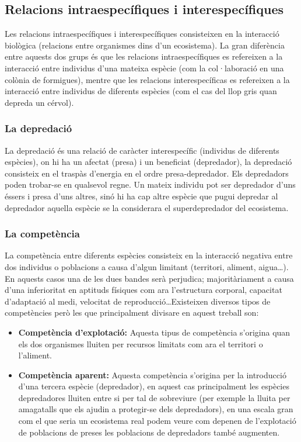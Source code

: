 \subsection{Relacions intraespecífiques i interespecífiques}
Les relacions intraespecífiques i interespecífiques consisteixen en la interacció biològica (relacions entre organismes dins d’un ecosistema). La gran diferència entre aquests dos grups és que les relacions intraespecífiques es refereixen a la interacció entre individus d’una mateixa espècie (com la col·laboració en una colònia de formigues), mentre que les relacions interespecíficas es refereixen a la interacció entre individus de diferents espècies (com el cas del llop gris quan depreda un cérvol).

\subsubsection{La depredació}
La depredació és una relació de caràcter interespecífic (individus de diferents espècies), on hi ha un afectat (presa) i un beneficiat (depredador), la depredació consisteix en el traspàs d’energia en el ordre presa-depredador. Els depredadors poden trobar-se en qualsevol regne. Un mateix individu pot ser depredador d'uns éssers i presa d'uns altres, sinó hi ha cap altre espècie que pugui depredar al depredador aquella espècie se la considerara el superdepredador del ecosistema.

\subsubsection{La competència}
La competència entre diferents espècies consisteix en la interacció negativa entre dos individus o poblacions a causa d’algun limitant (territori, aliment, aigua\dots). En aquests casos una de les dues bandes serà perjudica; majoritàriament a causa d’una inferioritat en aptituds físiques com ara l’estructura corporal, capacitat d’adaptació al medi, velocitat de reproducció\dots Existeixen diversos tipos de competències però les que principalment divisare en aquest treball son:

\begin{itemize}
    \item \textbf{Competència d’explotació:} Aquesta tipus de competència s’origina quan els dos organismes lluiten per recursos limitats com ara el territori o l’aliment.
    \item \textbf{Competència aparent:} Aquesta competència s'origina per la introducció d’una tercera espècie (depredador), en aquest cas principalment les espècies depredadores lluiten entre si per tal de sobreviure (per exemple la lluita per amagatalls que els ajudin a protegir-se dels depredadors), en una escala gran com el que seria un ecosistema real podem veure com depenen de l’explotació de poblacions de preses les poblacions de depredadors també augmenten.
\end{itemize}

